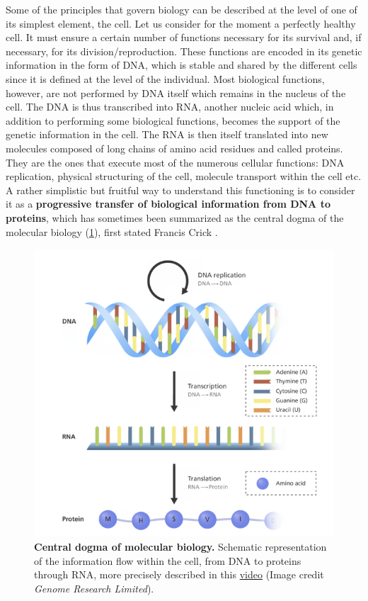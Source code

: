 \documentclass[a4paper,12pt,twoside,onecolumn,openright,final,oldfontcommands]{memoir}
\begin{document}
Some of the principles that govern biology can be described at the level
of one of its simplest element, the cell. Let us consider for the moment
a perfectly healthy cell. It must ensure a certain number of functions
necessary for its survival and, if necessary, for its
division/reproduction. These functions are encoded in its genetic
information in the form of DNA, which is stable and shared by the
different cells since it is defined at the level of the individual. Most
biological functions, however, are not performed by DNA itself which
remains in the nucleus of the cell. The DNA is thus transcribed into
RNA, another nucleic acid which, in addition to performing some
biological functions, becomes the support of the genetic information in
the cell. The RNA is then itself translated into new molecules composed
of long chains of amino acid residues and called proteins. They are the
ones that execute most of the numerous cellular functions: DNA
replication, physical structuring of the cell, molecule transport within
the cell etc. A rather simplistic but fruitful way to understand this
functioning is to consider it as a \textbf{progressive transfer of
biological information from DNA to proteins}, which has sometimes been
summarized as the central dogma of the molecular biology
(\ref{fig:central-dogma}), first stated Francis Crick
\citep{crick1970central}.

\begin{figure}

{\centering \includegraphics[width=0.8\linewidth]{fig/central-dogma} 

}

\caption[Central dogma of molecular biology]{\textbf{Central dogma of molecular biology.}
Schematic representation of the information flow within the cell, from
DNA to proteins through RNA, more precisely described in this
\href{https://www.youtube.com/watch?v=J3HVVi2k2No}{video} (Image credit
\emph{Genome Research Limited}).}\label{fig:central-dogma}
\end{figure}
\end{document}

